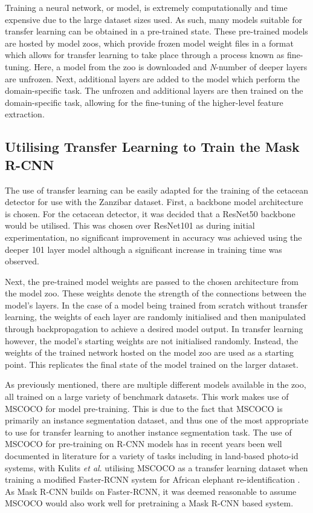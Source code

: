 Training a neural network, or model, is extremely computationally and time expensive due to the large dataset sizes used. As such, many models suitable for transfer learning can be obtained in a pre-trained state. These pre-trained models are hosted by model zoos, which provide frozen model weight files in a format which allows for transfer learning to take place through a process known as fine-tuning. Here, a model from the zoo is downloaded and \textit{N}-number of deeper layers are unfrozen. Next, additional layers are added to the model which perform the domain-specific task. The unfrozen and additional layers are then trained on the domain-specific task, allowing for the fine-tuning of the higher-level feature extraction. 

\subsection{Utilising Transfer Learning to Train the Mask R-CNN}\label{ch:cetDet,sec:initialTesting,sub:transferLearningforTheDetector}

The use of transfer learning can be easily adapted for the training of the cetacean detector for use with the Zanzibar dataset. First, a backbone model architecture is chosen. For the cetacean detector, it was decided that a ResNet50 \cite{he_deep_2015} backbone would be utilised. This was chosen over ResNet101 as during initial experimentation, no significant improvement in accuracy was achieved using the deeper 101 layer model although a significant increase in training time was observed.

Next, the pre-trained model weights are passed to the chosen architecture from the model zoo. These weights denote the strength of the connections between the model's layers. In the case of a model being trained from scratch without transfer learning, the weights of each layer are randomly initialised and then manipulated through backpropagation to achieve a desired model output. In transfer learning however, the model's starting weights are not initialised randomly. Instead, the weights of the trained network hosted on the model zoo are used as a starting point. This replicates the final state of the model trained on the larger dataset. 

As previously mentioned, there are multiple different models available in the zoo, all trained on a large variety of benchmark datasets. This work makes use of MSCOCO \cite{lin_microsoft_2014} for model pre-training. This is due to the fact that MSCOCO is primarily an instance segmentation dataset, and thus one of the most appropriate to use for transfer learning to another instance segmentation task. The use of MSCOCO for pre-training on R-CNN models has in recent years been well documented in literature for a variety of tasks \cite{yu_fruit_2019, couteaux_automatic_2019, fujita_fine-tuned_2020} including in land-based photo-id systems, with Kulits \textit{et al}. utilising MSCOCO as a transfer learning dataset when training a modified Faster-RCNN system for African elephant re-identification \cite{kulits_elephantbook_2021}. As Mask R-CNN builds on Faster-RCNN, it was deemed reasonable to assume MSCOCO would also work well for pretraining a Mask R-CNN based system.

